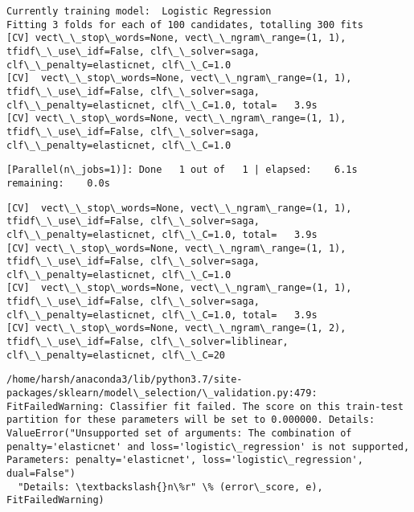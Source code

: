 \documentclass[11pt]{article}
\begin{document}
    \begin{Verbatim}[commandchars=\\\{\}]
Currently training model:  Logistic Regression
Fitting 3 folds for each of 100 candidates, totalling 300 fits
[CV] vect\_\_stop\_words=None, vect\_\_ngram\_range=(1, 1), tfidf\_\_use\_idf=False, clf\_\_solver=saga, clf\_\_penalty=elasticnet, clf\_\_C=1.0 
[CV]  vect\_\_stop\_words=None, vect\_\_ngram\_range=(1, 1), tfidf\_\_use\_idf=False, clf\_\_solver=saga, clf\_\_penalty=elasticnet, clf\_\_C=1.0, total=   3.9s
[CV] vect\_\_stop\_words=None, vect\_\_ngram\_range=(1, 1), tfidf\_\_use\_idf=False, clf\_\_solver=saga, clf\_\_penalty=elasticnet, clf\_\_C=1.0 

    \end{Verbatim}

    \begin{Verbatim}[commandchars=\\\{\}]
[Parallel(n\_jobs=1)]: Done   1 out of   1 | elapsed:    6.1s remaining:    0.0s

    \end{Verbatim}

    \begin{Verbatim}[commandchars=\\\{\}]
[CV]  vect\_\_stop\_words=None, vect\_\_ngram\_range=(1, 1), tfidf\_\_use\_idf=False, clf\_\_solver=saga, clf\_\_penalty=elasticnet, clf\_\_C=1.0, total=   3.9s
[CV] vect\_\_stop\_words=None, vect\_\_ngram\_range=(1, 1), tfidf\_\_use\_idf=False, clf\_\_solver=saga, clf\_\_penalty=elasticnet, clf\_\_C=1.0 
[CV]  vect\_\_stop\_words=None, vect\_\_ngram\_range=(1, 1), tfidf\_\_use\_idf=False, clf\_\_solver=saga, clf\_\_penalty=elasticnet, clf\_\_C=1.0, total=   3.9s
[CV] vect\_\_stop\_words=None, vect\_\_ngram\_range=(1, 2), tfidf\_\_use\_idf=False, clf\_\_solver=liblinear, clf\_\_penalty=elasticnet, clf\_\_C=20 

    \end{Verbatim}

    \begin{Verbatim}[commandchars=\\\{\}]
/home/harsh/anaconda3/lib/python3.7/site-packages/sklearn/model\_selection/\_validation.py:479: FitFailedWarning: Classifier fit failed. The score on this train-test partition for these parameters will be set to 0.000000. Details: 
ValueError("Unsupported set of arguments: The combination of penalty='elasticnet' and loss='logistic\_regression' is not supported, Parameters: penalty='elasticnet', loss='logistic\_regression', dual=False")
  "Details: \textbackslash{}n\%r" \% (error\_score, e), FitFailedWarning)

    \end{Verbatim}
\end{document}
